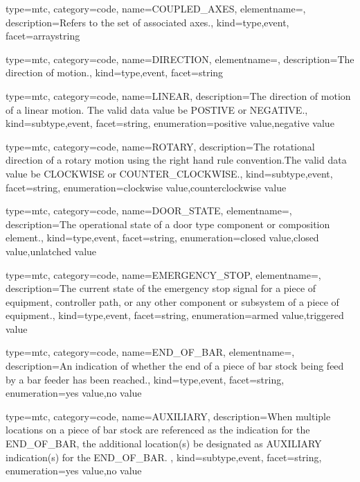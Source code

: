{
  type=mtc,
  category=code,
  name={COUPLED\_AXES},
  elementname=,
  description={Refers to the set of associated axes.},
  kind={type,event},
  facet={\gls{arraystring}}
}


{
  type=mtc,
  category=code,
  name={DIRECTION},
  elementname=,
  description={The direction of motion.},
  kind={type,event},
  facet={\gls{string}}
}


{
  type=mtc,
  category=code,
  name={LINEAR},
  description={The direction of motion of a linear motion.   The \gls{valid data value} \must be POSTIVE or NEGATIVE.},
  kind={subtype,event},
  facet={\gls{string}},
  enumeration={\gls{positive value},\gls{negative value}}
}


{
  type=mtc,
  category=code,
  name={ROTARY},
  description={The rotational direction of a rotary motion using the right hand rule convention.The \gls{valid data value} \must be CLOCKWISE or COUNTER\_CLOCKWISE.},
  kind={subtype,event},
  facet={\gls{string}},
  enumeration={\gls{clockwise value},\gls{counterclockwise value}}
}


{
  type=mtc,
  category=code,
  name={DOOR\_STATE},
  elementname=,
  description={The operational state of a \gls{door} type component or composition element.},
  kind={type,event},
  facet={\gls{string}},
  enumeration={\gls{closed value},\gls{closed value},\gls{unlatched value}}
}


{
  type=mtc,
  category=code,
  name={EMERGENCY\_STOP},
  elementname=,
  description={The current state of the emergency stop signal for a piece of equipment, controller path, or any other component or subsystem of a piece of equipment.},
  kind={type,event},
  facet={\gls{string}},
  enumeration={\gls{armed value},\gls{triggered value}}
}


{
  type=mtc,
  category=code,
  name={END\_OF\_BAR},
  elementname=,
  description={An indication of whether the end of a piece of bar stock being feed by a bar feeder has been reached.},
  kind={type,event},
  facet={\gls{string}},
  enumeration={\gls{yes value},\gls{no value}}
}


{
  type=mtc,
  category=code,
  name={AUXILIARY},
  description={When multiple locations on a piece of bar stock are referenced as the indication for the END\_OF\_BAR, the additional location(s) \must be designated as AUXILIARY indication(s) for the END\_OF\_BAR.  },
  kind={subtype,event},
  facet={\gls{string}},
  enumeration={\gls{yes value},\gls{no value}}
}


